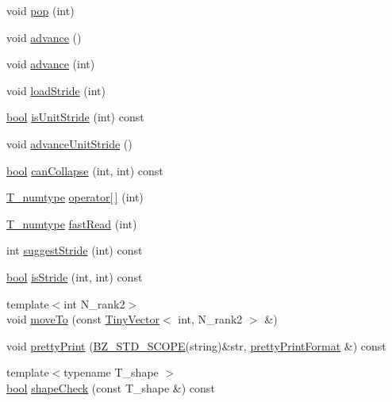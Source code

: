 \begin{DoxyCompactItemize}
void \hyperlink{classArrayIndexMapping_aec62adf980f388f432beda43bc959638}{pop} (int)
\item 
void \hyperlink{classArrayIndexMapping_aeaa628fc5a4d148b66140927d3958f93}{advance} ()
\item 
void \hyperlink{classArrayIndexMapping_a254be05357737d596e3cbc084b9384e3}{advance} (int)
\item 
void \hyperlink{classArrayIndexMapping_ae31e6652230ac43317f1ca92a1731c4f}{load\+Stride} (int)
\item 
\hyperlink{compiler_8h_abb452686968e48b67397da5f97445f5b}{bool} \hyperlink{classArrayIndexMapping_a23299bfce62be7f165f2766df7efcc2a}{is\+Unit\+Stride} (int) const 
\item 
void \hyperlink{classArrayIndexMapping_a04f634d0edc0929cbbdff2ad30251f39}{advance\+Unit\+Stride} ()
\item 
\hyperlink{compiler_8h_abb452686968e48b67397da5f97445f5b}{bool} \hyperlink{classArrayIndexMapping_ac444b8ae2b67e63441eb3f887c5bcdc4}{can\+Collapse} (int, int) const 
\item 
\hyperlink{classArrayIndexMapping_a650b2e3c2658a771235ae3cc4692e331}{T\+\_\+numtype} \hyperlink{classArrayIndexMapping_a8c32c56fa22f9e34215d41eb7b548cc6}{operator\mbox{[}$\,$\mbox{]}} (int)
\item 
\hyperlink{classArrayIndexMapping_a650b2e3c2658a771235ae3cc4692e331}{T\+\_\+numtype} \hyperlink{classArrayIndexMapping_a1a578325005087f04c511be10fb98c13}{fast\+Read} (int)
\item 
int \hyperlink{classArrayIndexMapping_a166d6339fd35383033df04a96168a623}{suggest\+Stride} (int) const 
\item 
\hyperlink{compiler_8h_abb452686968e48b67397da5f97445f5b}{bool} \hyperlink{classArrayIndexMapping_a322c78781426b072b937a8c6fd524447}{is\+Stride} (int, int) const 
\item 
{\footnotesize template$<$int N\+\_\+rank2$>$ }\\void \hyperlink{classArrayIndexMapping_a78a626734e1e5517919d8c0c57ac62d4}{move\+To} (const \hyperlink{classTinyVector}{Tiny\+Vector}$<$ int, N\+\_\+rank2 $>$ \&)
\item 
void \hyperlink{classArrayIndexMapping_aabf6909d4712f353d626f6e10112b728}{pretty\+Print} (\hyperlink{numinquire_8h_a2b24ffc3b4ef9803956bc7715c6c7b83}{B\+Z\+\_\+\+S\+T\+D\+\_\+\+S\+C\+O\+P\+E}(string)\&str, \hyperlink{classprettyPrintFormat}{pretty\+Print\+Format} \&) const 
\item 
{\footnotesize template$<$typename T\+\_\+shape $>$ }\\\hyperlink{compiler_8h_abb452686968e48b67397da5f97445f5b}{bool} \hyperlink{classArrayIndexMapping_aaccf66cc55e67bee806faffdfcc3808c}{shape\+Check} (const T\+\_\+shape \&) const 
\end{DoxyCompactItemize}

